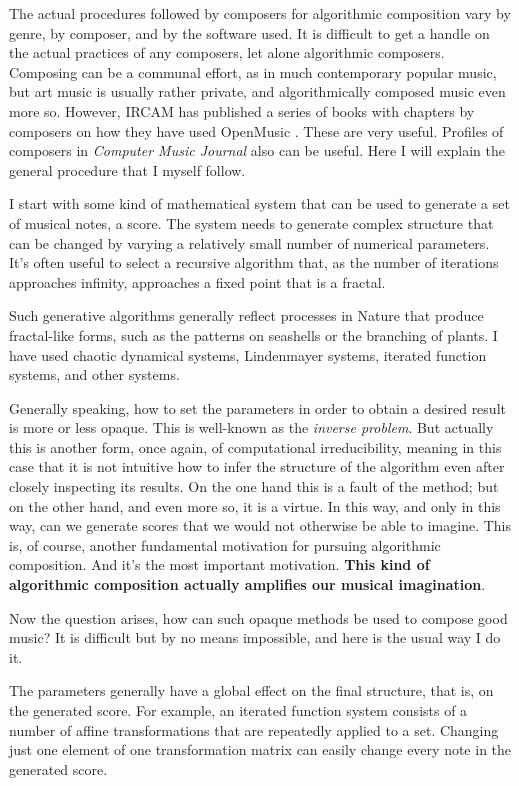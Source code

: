 \documentclass[11pt]{scrartcl}
\begin{document}
The actual procedures followed by composers for algorithmic composition vary by genre, by composer, and by the software used. It is difficult to get a handle on the actual practices of any composers, let alone algorithmic composers. Composing can be a communal effort, as in much contemporary popular music, but art music is usually rather private, and algorithmically composed music even more so. However, IRCAM has published a series of books with chapters by composers on how they have used OpenMusic \parencite{omcomposersbook, agon2006om, agon2008om, agon2016om}. These are very useful. Profiles of composers in \emph{Computer Music Journal} also can be useful. Here I will explain the general procedure that I myself follow.

I start with some kind of mathematical system that can be used to generate a set of musical notes, a score. The system needs to generate complex structure that can be changed by varying a relatively small number of numerical parameters. It’s often useful to select a recursive algorithm that, as the number of iterations approaches infinity, approaches a fixed point that is a fractal.

Such generative algorithms generally reflect processes in Nature that produce fractal-like forms, such as the patterns on seashells or the branching of plants. I have used chaotic dynamical systems, Lindenmayer systems, iterated function systems, and other systems.

Generally speaking, how to set the parameters in order to obtain a desired result is more or less opaque. This is well-known as the \emph{inverse problem}. But actually this is another form, once again, of computational irreducibility, meaning in this case that it is not intuitive how to infer the structure of the algorithm even after closely inspecting its results. On the one hand this is a fault of the method; but on the other hand, and even more so, it is a virtue. In this way, and only in this way, can we generate scores that we would not otherwise be able to imagine. This is, of course, another fundamental motivation for pursuing algorithmic composition. And it's the most important motivation. \textbf{This kind of algorithmic composition actually amplifies our musical imagination}.

Now the question arises, how can such opaque methods be used to compose good music? It is difficult but by no means impossible, and here is the usual way I do it.

The parameters generally have a global effect on the final structure, that is, on the generated score. For example, an iterated function system consists of a number of affine transformations that are repeatedly applied to a set. Changing just one element of one transformation matrix can easily change every note in the generated score.
\end{document}

